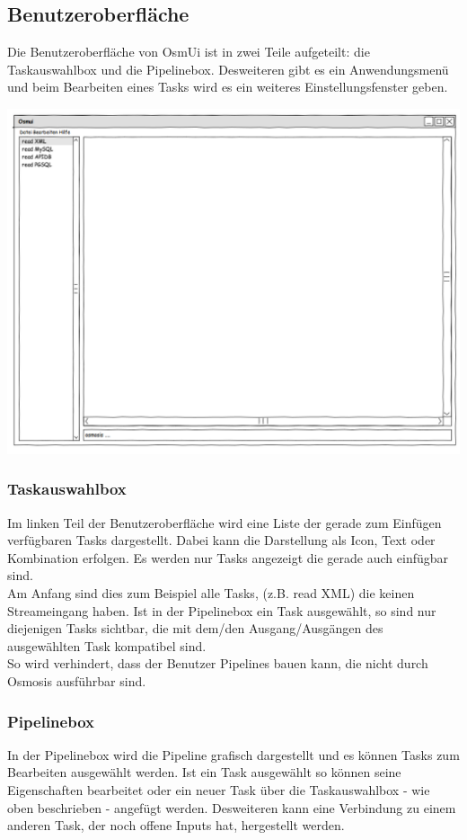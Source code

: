 \documentclass[a4paper,10pt]{scrartcl}
\begin{document}
\subsection{Benutzeroberfläche}
Die Benutzeroberfläche von OsmUi ist in zwei Teile aufgeteilt: die Taskauswahlbox und die Pipelinebox. Desweiteren gibt es ein Anwendungsmenü und beim Bearbeiten eines Tasks
wird es ein weiteres Einstellungsfenster geben.\\
\begin{center}
\includegraphics[width=15cm]{ui_prototype/OsmUi_Startseite.png}
\end{center}
\subsubsection{Taskauswahlbox}
Im linken Teil der Benutzeroberfläche wird eine Liste der gerade zum Einfügen verfügbaren Tasks dargestellt. Dabei kann die Darstellung als Icon,
Text oder Kombination erfolgen. Es werden nur Tasks angezeigt die gerade auch einfügbar sind. \\
Am Anfang sind dies zum Beispiel alle Tasks, (z.B. read XML) die keinen Streameingang haben. Ist in der Pipelinebox ein Task ausgewählt, so
sind nur diejenigen Tasks sichtbar, die mit dem/den Ausgang/Ausgängen des ausgewählten Task kompatibel sind.\\
So wird verhindert, dass der Benutzer Pipelines bauen kann, die nicht durch Osmosis ausführbar sind.
\subsubsection{Pipelinebox}
In der Pipelinebox wird die Pipeline grafisch dargestellt und es können Tasks zum Bearbeiten ausgewählt werden. Ist ein Task ausgewählt so können seine Eigenschaften
bearbeitet oder ein neuer Task über die Taskauswahlbox - wie oben beschrieben - angefügt werden. Desweiteren kann eine Verbindung zu einem anderen Task, der noch offene
Inputs hat, hergestellt werden.
\end{document}
